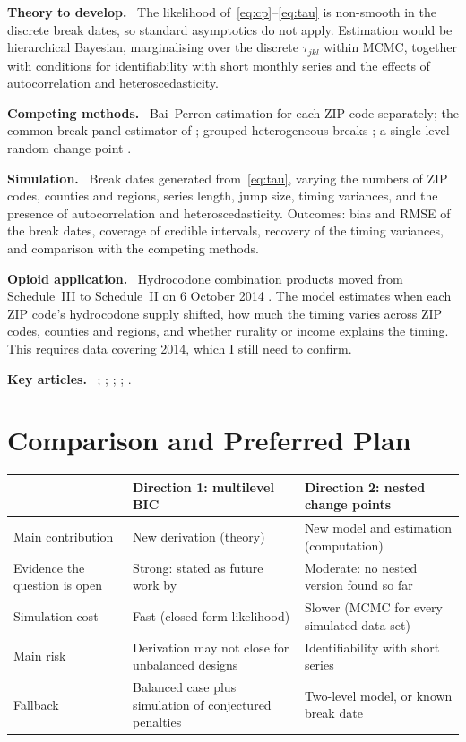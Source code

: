 \documentclass[10pt]{article}
\newcommand{\para}[1]{\textbf{#1}\ }
\begin{document}
\para{Theory to develop.} The likelihood of~\eqref{eq:cp}--\eqref{eq:tau} is non-smooth in the discrete break dates, so standard asymptotics do not apply. Estimation would be hierarchical Bayesian, marginalising over the discrete $\tau_{jkl}$ within MCMC, together with conditions for identifiability with short monthly series and the effects of autocorrelation and heteroscedasticity.

\para{Competing methods.} Bai--Perron estimation for each ZIP code separately; the common-break panel estimator of \citet{bai2010}; grouped heterogeneous breaks \citep{okui2021}; a single-level random change point \citep{brilleman2017}.

\para{Simulation.} Break dates generated from~\eqref{eq:tau}, varying the numbers of ZIP codes, counties and regions, series length, jump size, timing variances, and the presence of autocorrelation and heteroscedasticity. Outcomes: bias and RMSE of the break dates, coverage of credible intervals, recovery of the timing variances, and comparison with the competing methods.

\para{Opioid application.} Hydrocodone combination products moved from Schedule~III to Schedule~II on 6 October 2014 \citep{dea2014}. The model estimates when each ZIP code's hydrocodone supply shifted, how much the timing varies across ZIP codes, counties and regions, and whether rurality or income explains the timing. This requires data covering 2014, which I still need to confirm.

\para{Key articles.} \citet{baiperron1998}; \citet{bai2010}; \citet{okui2021}; \citet{lumsdaine2023}; \citet{brilleman2017}.

\clearpage
\section{Comparison and Preferred Plan}

\begin{center}
\small
\begin{tabularx}{\linewidth}{@{}l>{\raggedright\arraybackslash}X>{\raggedright\arraybackslash}X@{}}
\toprule
 & \textbf{Direction 1: multilevel BIC} & \textbf{Direction 2: nested change points}\\
\midrule
Main contribution & New derivation (theory) & New model and estimation (computation)\\
Evidence the question is open & Strong: stated as future work by \citet{cho2024} & Moderate: no nested version found so far\\
Simulation cost & Fast (closed-form likelihood) & Slower (MCMC for every simulated data set)\\
Main risk & Derivation may not close for unbalanced designs & Identifiability with short series\\
Fallback & Balanced case plus simulation of conjectured penalties & Two-level model, or known break date\\
\bottomrule
\end{tabularx}
\end{center}
\end{document}
